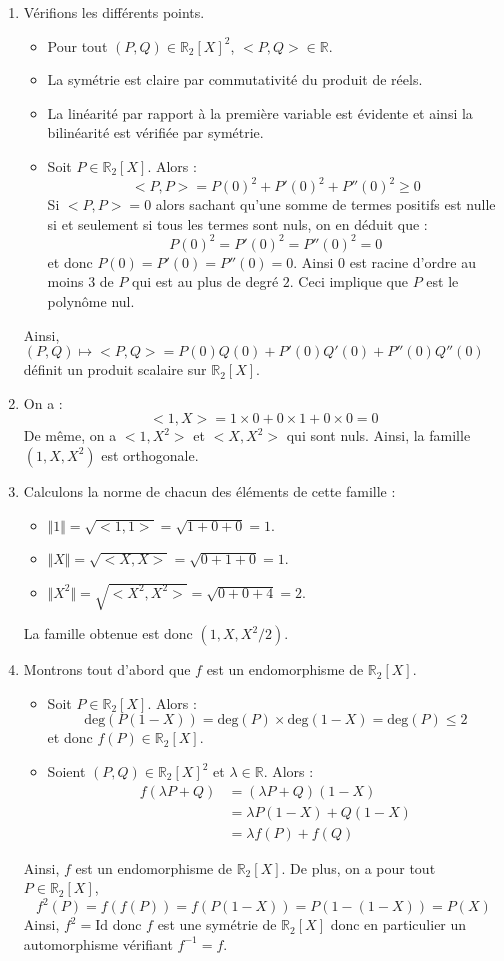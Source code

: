 \documentclass[a4paper,10pt]{report}
\begin{document}
\begin{corr} 
\begin{enumerate}
\item Vérifions les différents points.
\begin{itemize}
\item Pour tout $(P,Q) \in \mathbb{R}_2[X]^2$, $<P,Q> \in \mathbb{R}$.
\item La symétrie est claire par commutativité du produit de réels.
\item La linéarité par rapport à la première variable est évidente et ainsi la bilinéarité est vérifiée par symétrie.
\item Soit $P \in \mathbb{R}_2[X]$. Alors :
$$ <P,P> = P(0)^2 + P'(0)^2 + P''(0)^2 \geq 0$$
Si $<P,P>=0$ alors sachant qu'une somme de termes positifs est nulle si et seulement si tous les termes sont nuls, on en déduit que :
$$ P(0)^2 = P'(0)^2= P''(0)^2 = 0$$
et donc $P(0)=P'(0)=P''(0)=0$. Ainsi $0$ est racine d'ordre au moins $3$ de $P$ qui est au plus de degré $2$. Ceci implique que $P$ est le polynôme nul.
\end{itemize}
Ainsi, $(P,Q) \mapsto <P,Q> = P(0)Q(0)+ P'(0)Q'(0)+P''(0)Q''(0)$ définit un produit scalaire sur $\mathbb{R}_2[X]$.
\item On a :
$$ <1,X> = 1 \times 0 + 0 \times 1 + 0 \times 0 = 0$$
De même, on a $<1,X^2>$ et $<X,X^2>$ qui sont nuls. Ainsi, la famille $(1,X,X^2)$ est orthogonale.
\item Calculons la norme de chacun des éléments de cette famille :
\begin{itemize}
\item $\Vert 1 \Vert = \sqrt{<1,1>} = \sqrt{1+0+0}= 1$.
\item $\Vert X \Vert = \sqrt{<X,X>} = \sqrt{0+1+0} = 1$.
\item $\Vert X^2 \Vert = \sqrt{<X^2,X^2>} = \sqrt{0+0+4} = 2$.
\end{itemize}
La famille obtenue est donc $(1,X,X^2/2)$.
\item Montrons tout d'abord que $f$ est un endomorphisme de $\mathbb{R}_2[X]$.
\begin{itemize}
\item Soit $P \in \mathbb{R}_2[X]$. Alors :
$$ \textrm{deg}(P(1-X))= \textrm{deg}(P) \times \textrm{deg}(1-X) = \textrm{deg}(P) \leq 2$$
et donc $f(P) \in \mathbb{R}_2[X]$.
\item Soient $(P,Q) \in \mathbb{R}_2[X]^2$ et $\lambda \in \mathbb{R}$. Alors :
\begin{align*}
f(\lambda P +Q) & = (\lambda P + Q)(1-X) \\
& = \lambda P(1-X) + Q(1-X) \\
& = \lambda f(P)+ f(Q) 
\end{align*}
\end{itemize}
Ainsi, $f$ est un endomorphisme de $\mathbb{R}_2[X]$. De plus, on a pour tout $P \in \mathbb{R}_2[X]$,
$$ f^2(P) = f(f(P))=f(P(1-X))= P(1-(1-X))=P(X)$$
Ainsi, $f^2= \textrm{Id}$ donc $f$ est une symétrie de $\mathbb{R}_2[X]$ donc en particulier un automorphisme vérifiant $f^{-1}=f$.


\end{enumerate}
\end{corr}
\end{document}
